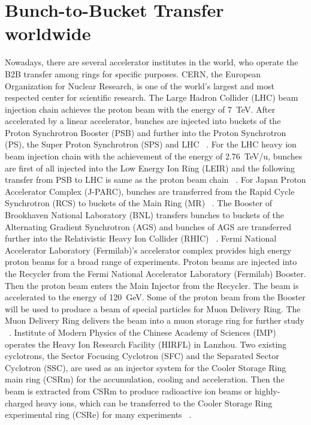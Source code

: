 \section{Bunch-to-Bucket Transfer worldwide}
Nowadays, there are several accelerator institutes in the world, who operate the B2B transfer among rings for specific purposes. 
\gls{CERN}, the European Organization for Nuclear Research, is one of the world's largest and most respected center for scientific research. The Large Hadron Collider (\gls{LHC}) beam injection chain achieves the proton beam with the energy of \SI{7}{TeV}. After accelerated by a linear accelerator, bunches are injected into buckets of the Proton Synchrotron Booster (\gls{PSB}) and further into the Proton Synchrotron (\gls{PS}), the Super Proton Synchrotron (\gls{SPS}) and LHC ~\cite{ferrand_cern-acc-note-2015-0025_2015}. For the LHC heavy ion beam injection chain with the achievement of the energy of \SI{2.76}{TeV/u}, bunches are first of all injected into the Low Energy Ion Ring (\gls{LEIR}) and the following transfer from PSB to LHC is same as the proton beam chain ~\cite{ferrand_cern-acc-note-2015-0025_2015}. For Japan Proton Accelerator Complex (\gls{J-PARC}), bunches are transferred from the Rapid Cycle Synchrotron (\gls{RCS}) to buckets of the Main Ring (\gls{MR}) ~\cite{noauthor_j-parc_2016}. The Booster of Brookhaven National Laboratory (\gls{BNL}) transfers bunches to buckets of the Alternating Gradient Synchrotron (\gls{AGS}) and bunches of AGS are transferred further into the Relativistic Heavy Ion Collider (\gls{RHIC}) ~\cite{noauthor_brookhaven_2017}. Fermi National Accelerator Laboratory (\gls{Fermilab})'s accelerator complex provides high energy proton beams for a broad range of experiments. Proton beams are injected into the Recycler from the Fermi National Accelerator Laboratory (\gls{Fermilab}) Booster. Then the proton beam enters the Main Injector from the Recycler. The beam is accelerated to the energy of \SI{120}{GeV}. Some of the proton beam from the Booster will be used to produce a beam of special particles for Muon Delivery Ring. The Muon Delivery Ring delivers the beam into a muon storage ring for further study ~\cite{noauthor_fermi_2016}. Institute of Modern Physics of the Chinese Academy of Sciences (\gls{IMP}) operates the Heavy Ion Research Facility (\gls{HIRFL}) in Lanzhou. Two existing cyclotrons, the Sector Focusing Cyclotron (\gls{SFC}) and the Separated Sector Cyclotron (\gls{SSC}), are used as an injector system for the Cooler Storage Ring main ring (\gls{CSRm}) for the accumulation, cooling and acceleration. Then the beam is extracted from CSRm to produce radioactive ion beams or highly-charged heavy ions, which can be transferred to the Cooler Storage Ring experimental ring (\gls{CSRe}) for many experiments ~\cite{noauthor_institute_2013, man_survey_2002}.  


